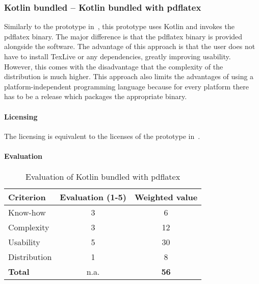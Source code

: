 \subsubsection{Kotlin bundled – Kotlin bundled with pdflatex}\label{sec:kotlin_bundled}
Similarly to the prototype in~, this prototype uses Kotlin and invokes the pdflatex binary.
The major difference is that the pdflatex binary is provided alongside
the software.
The advantage of this approach is that the user does not have to install TexLive or any dependencies, greatly improving usability.
However, this comes with the disadvantage that the complexity of the distribution is much higher.
This approach also limits the advantages of using a platform-independent programming language because for every platform there has to be a release
which packages the appropriate binary.

\paragraph{Licensing}
The licensing is equivalent to the licenses of the prototype in~.

\paragraph{Evaluation}
\begin{table}[H]
    \centering
    \begin{tabular}{l c c}
        \toprule
        \textbf{Criterion} & \textbf{Evaluation (1{-}5)} & \textbf{Weighted value} \\
        \midrule
        Know-how           & 3                           & 6                       \\
        \midrule
        Complexity         & 3                           & 12                      \\
        \midrule
        Usability          & 5                           & 30                      \\
        \midrule
        Distribution       & 1                           & 8                       \\
        \midrule
        \textbf{Total}     & n.a.                        & \textbf{56}             \\
        \bottomrule
    \end{tabular}
    \caption{Evaluation of Kotlin bundled with pdflatex}\label{table:kotlin_bundled_evaluation}
\end{table}

